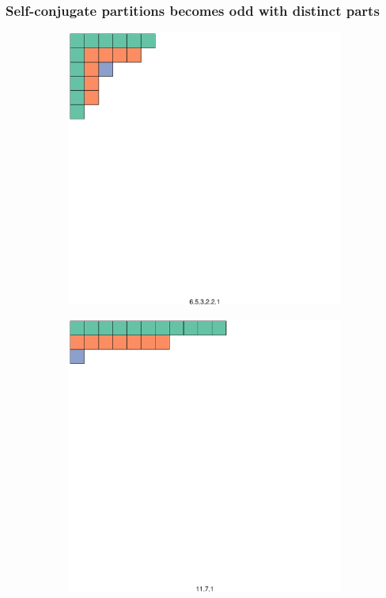 \documentclass{beamer}
\begin{document}
\begin{frame}
\frametitle{Self-conjugate partitions becomes odd with distinct parts}

\begin{figure}
     \centering
     \begin{subfigure}[b]{0.4\textwidth}
         \centering
         \includegraphics[width=\textwidth]{SelfConjugate}
     \end{subfigure}
     \hfill
     \begin{subfigure}[b]{0.5\textwidth}
         \centering
         \includegraphics[width=\textwidth]{DistinctOdd}

\end{subfigure}
\end{figure}
\end{frame}
\end{document}
